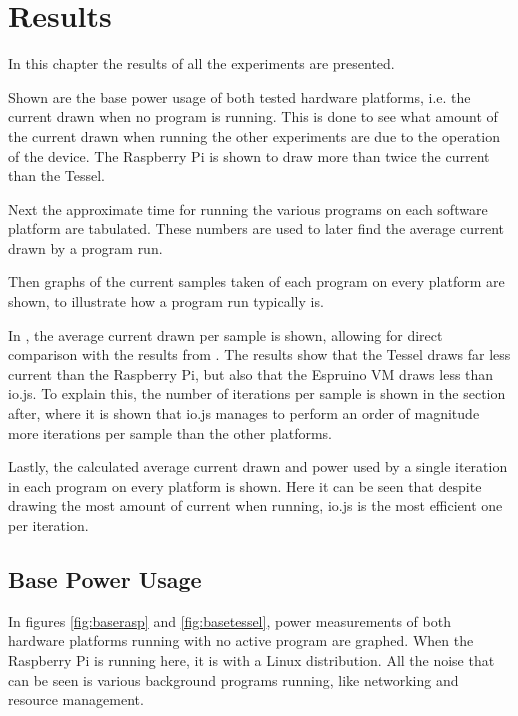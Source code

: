 \chapter{Results}
\label{chap:chapter4}

In this chapter the results of all the experiments are presented.

Shown are the base power usage of both tested hardware platforms, i.e. the current drawn when no program is running.
This is done to see what amount of the current drawn when running the other experiments are due to the operation of the device.
The Raspberry Pi is shown to draw more than twice the current than the Tessel.

Next the approximate time for running the various programs on each software platform are tabulated.
These numbers are used to later find the average current drawn by a program run.

Then graphs of the current samples taken of each program on every platform are shown, to illustrate how a program run typically is.

In , the average current drawn per sample is shown, allowing for direct comparison with the results from .
The results show that the Tessel draws far less current than the Raspberry Pi, but also that the Espruino VM draws less than io.js.
To explain this, the number of iterations per sample is shown in the section after, where it is shown that io.js manages to perform an order of magnitude more iterations per sample than the other platforms.

Lastly, the calculated average current drawn and power used by a single iteration in each program on every platform is shown.
Here it can be seen that despite drawing the most amount of current when running, io.js is the most efficient one per iteration.

\section{Base Power Usage}
\label{sec:basepower}
In figures \ref{fig:baserasp} and \ref{fig:basetessel}, power measurements of both hardware platforms running with no active program are graphed.
When the Raspberry Pi is running here, it is with a Linux distribution.
All the noise that can be seen is various background programs running, like networking and resource management.

